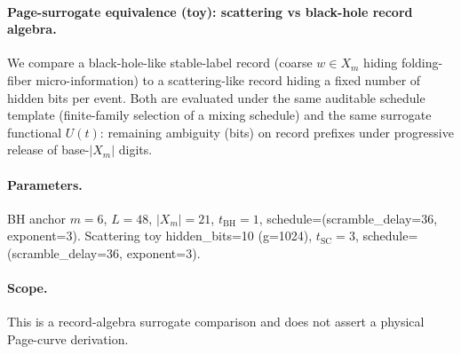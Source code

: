 \paragraph{Page-surrogate equivalence (toy): scattering vs black-hole record algebra.} \AuditTag We compare a black-hole-like stable-label record (coarse $w\in X_m$ hiding folding-fiber micro-information) to a scattering-like record hiding a fixed number of hidden bits per event. Both are evaluated under the same auditable schedule template (finite-family selection of a mixing schedule) and the same surrogate functional $U(t)$: remaining ambiguity (bits) on record prefixes under progressive release of base-$|X_m|$ digits.
\paragraph{Parameters.} \AuditTag BH anchor $m=6$, $L=48$, $|X_m|=21$, $t_{\mathrm{BH}}=1$, schedule=(scramble\_delay=36, exponent=3). Scattering toy hidden\_bits=10 (g=1024), $t_{\mathrm{SC}}=3$, schedule=(scramble\_delay=36, exponent=3).
\paragraph{Scope.} \AuditTag This is a record-algebra surrogate comparison and does not assert a physical Page-curve derivation.